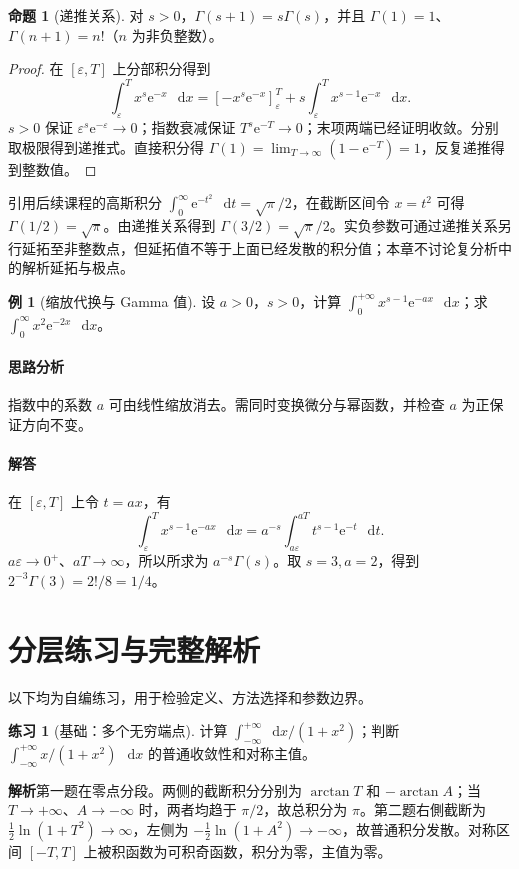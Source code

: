 \documentclass[UTF8,fontset=fandol,12pt,oneside,openany]{ctexrep}
\newcommand{\dd}{\mathop{}\!\mathrm d}
\newcommand{\ee}{\mathrm e}
\theoremstyle{definition}
\newtheorem{proposition}[theorem]{命题}
\newtheorem{example}{例}[chapter]
\newtheorem{exercise}{练习}[chapter]
\begin{document}
\begin{proposition}[递推关系]
对 $s>0$，$\Gamma(s+1)=s\Gamma(s)$，并且 $\Gamma(1)=1$、$\Gamma(n+1)=n!$（$n$ 为非负整数）。
\end{proposition}
\begin{proof}
在 $[\varepsilon,T]$ 上分部积分得到
\[
\int_\varepsilon^T x^s\ee^{-x}\,\dd x
=[-x^s\ee^{-x}]_\varepsilon^T
+s\int_\varepsilon^T x^{s-1}\ee^{-x}\,\dd x.
\]
$s>0$ 保证 $\varepsilon^s\ee^{-\varepsilon}\to0$；指数衰减保证 $T^s\ee^{-T}\to0$；末项两端已经证明收敛。分别取极限得到递推式。直接积分得 $\Gamma(1)=\lim_{T\to\infty}(1-\ee^{-T})=1$，反复递推得到整数值。
\end{proof}
引用后续课程的高斯积分 $\int_0^\infty\ee^{-t^2}\,\dd t=\sqrt\pi/2$，在截断区间令 $x=t^2$ 可得 $\Gamma(1/2)=\sqrt\pi$。由递推关系得到 $\Gamma(3/2)=\sqrt\pi/2$。实负参数可通过递推关系另行延拓至非整数点，但延拓值不等于上面已经发散的积分值；本章不讨论复分析中的解析延拓与极点。

\begin{example}[缩放代换与 Gamma 值]
设 $a>0$，$s>0$，计算 $\int_0^{+\infty}x^{s-1}\ee^{-ax}\,\dd x$；求 $\int_0^\infty x^2\ee^{-2x}\,\dd x$。
\end{example}
\paragraph{思路分析} 指数中的系数 $a$ 可由线性缩放消去。需同时变换微分与幂函数，并检查 $a$ 为正保证方向不变。
\paragraph{解答} 在 $[\varepsilon,T]$ 上令 $t=ax$，有
\[
\int_\varepsilon^T x^{s-1}\ee^{-ax}\,\dd x
=a^{-s}\int_{a\varepsilon}^{aT}t^{s-1}\ee^{-t}\,\dd t.
\]
$a\varepsilon\to0^+$、$aT\to\infty$，所以所求为 $a^{-s}\Gamma(s)$。取 $s=3,a=2$，得到 $2^{-3}\Gamma(3)=2!/8=1/4$。

\section{分层练习与完整解析}
以下均为自编练习，用于检验定义、方法选择和参数边界。

\begin{exercise}[基础：多个无穷端点]
计算 $\int_{-\infty}^{+\infty}\dd x/(1+x^2)$；判断 $\int_{-\infty}^{+\infty}x/(1+x^2)\,\dd x$ 的普通收敛性和对称主值。
\end{exercise}
\noindent\textbf{解析}\quad 第一题在零点分段。两侧的截断积分分别为 $\arctan T$ 和 $-\arctan A$；当 $T\to+\infty$、$A\to-\infty$ 时，两者均趋于 $\pi/2$，故总积分为 $\pi$。第二题右側截断为 $\tfrac12\ln(1+T^2)\to\infty$，左侧为 $-\tfrac12\ln(1+A^2)\to-\infty$，故普通积分发散。对称区间 $[-T,T]$ 上被积函数为可积奇函数，积分为零，主值为零。
\end{document}
